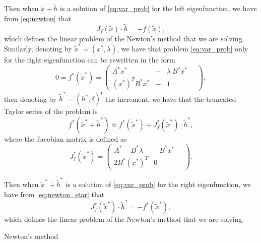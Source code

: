 \documentclass[smallextended]{svjour3}
\begin{document}
Then when $\tilde x + \tilde h$ is a solution of \eqref{eq:var_prob} for the left eigenfunction, we have from \eqref{eq:newton}
that 
$$
J_f(\tilde x)\cdot \tilde h = - f(\tilde x),
$$
which defines the linear problem of the Newton's method that we are solving.
Similarly, denoting by $\tilde x^*=(x^*,\lambda)$, we have that problem \eqref{eq:var_prob} only for the right eigenfunction can be rewritten in the form
$$
0=f^*(\tilde x^*)=
\left(
\begin{array}{lcl}
A^* x^*&-& \lambda\ B^*x^*
\\
  (x^*)^T B^*x^*&-& 1
\end{array}\quad
\right) ,
$$
then denoting by $\tilde h^*=(h^*, \delta)^t$ the increment, we have that the truncated Taylor series of the problem is
\begin{equation}\label{eq:newton_star}
f^*(\tilde x^* + \tilde h^*)\approx f^*(\tilde x^*) + J_f^*(\tilde x^*)\cdot \tilde h^*, 
\end{equation}
where the Jacobian matrix is defined as
$$
J_f^*(\tilde x^*)=
\left(
\begin{array}{lr}
A^* - B^*\lambda & -B^*x^*
\\
  2B^*(x^*)^T  & 0
\end{array}\quad
\right) .
$$

Then when $\tilde x^* + \tilde h^*$ is a solution of \eqref{eq:var_prob} for the right eigenfunction, we have from \eqref{eq:newton_star}
that 
$$
J_f^*(\tilde x^*)\cdot \tilde h^* = - f^*(\tilde x^*),
$$
which defines the linear problem of the Newton's method that we are solving.






\begin{algorithm}[!ht] \caption{Newton's method} \label{alg:newton} 
\begin{algorithmic}


\REPEAT

\end{algorithmic}
\end{algorithm}
\end{document}
